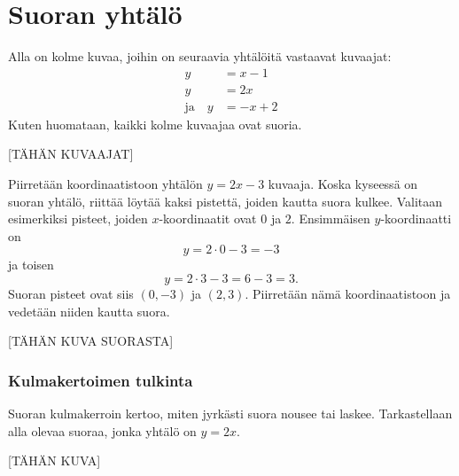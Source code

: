 \section{Suoran yhtälö}


Alla on kolme kuvaa, joihin on seuraavia yhtälöitä vastaavat kuvaajat:
\begin{align*}
y & =x-1 \\
y & =2x \\
\text{ja} \quad y & =-x+2
\end{align*}
Kuten huomataan, kaikki kolme kuvaajaa ovat suoria.

[TÄHÄN KUVAAJAT]


\begin{esimerkki} Piirretään koordinaatistoon yhtälön $y=2x-3$ kuvaaja. Koska kyseessä on suoran yhtälö, riittää löytää kaksi pistettä, joiden kautta suora kulkee.
Valitaan esimerkiksi pisteet, joiden $x$-koordinaatit ovat $0$ ja $2$. Ensimmäisen $y$-koordinaatti on
\[
y=2\cdot 0-3=-3
\]
ja toisen
\[
y=2\cdot 3-3=6-3=3.
\]
Suoran pisteet ovat siis $(0, -3)$ ja $(2, 3)$. Piirretään nämä koordinaatistoon ja vedetään niiden kautta suora.

[TÄHÄN KUVA SUORASTA]
\end{esimerkki}

\subsubsection*{Kulmakertoimen tulkinta}

Suoran kulmakerroin kertoo, miten jyrkästi suora nousee tai laskee. Tarkastellaan alla olevaa suoraa, jonka yhtälö on $y=2x$.

[TÄHÄN KUVA]

